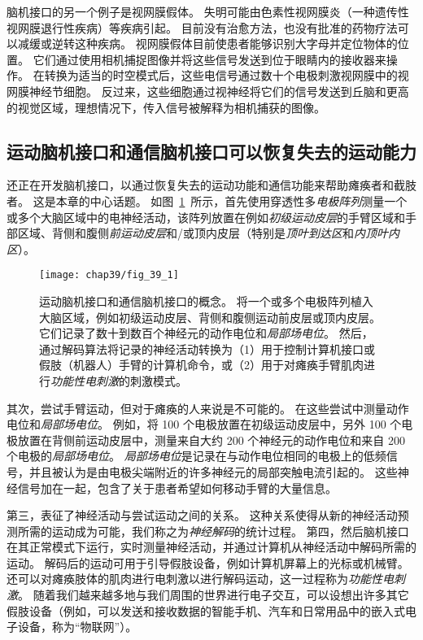 脑机接口的另一个例子是视网膜假体。
失明可能由色素性视网膜炎（一种遗传性视网膜退行性疾病）等疾病引起。
目前没有治愈方法，也没有批准的药物疗法可以减缓或逆转这种疾病。
视网膜假体目前使患者能够识别大字母并定位物体的位置。
它们通过使用相机捕捉图像并将这些信号发送到位于眼睛内的接收器来操作。
在转换为适当的时空模式后，这些电信号通过数十个电极刺激视网膜中的视网膜神经节细胞。
反过来，这些细胞通过视神经将它们的信号发送到丘脑和更高的视觉区域，理想情况下，传入信号被解释为相机捕获的图像。



\subsection{运动脑机接口和通信脑机接口可以恢复失去的运动能力}

还正在开发脑机接口，以通过恢复失去的运动功能和通信功能来帮助瘫痪者和截肢者。
这是本章的中心话题。
如图~\ref{fig:39_1}~所示，首先使用穿透性多\textit{电极阵列}测量一个或多个大脑区域中的电神经活动，该阵列放置在例如\textit{初级运动皮层}的手臂区域和手部区域、背侧和腹侧\textit{前运动皮层}和/或顶内皮层（特别是\textit{顶叶到达区}和\textit{内顶叶内区}）。


\begin{figure}[htbp]
	\centering
	\texttt{[image: chap39/fig\_39\_1]}
	\caption{运动脑机接口和通信脑机接口的概念。
		将一个或多个电极阵列植入大脑区域，例如初级运动皮层、背侧和腹侧运动前皮层或顶内皮层。
		它们记录了数十到数百个神经元的动作电位和\textit{局部场电位}。
		然后，通过解码算法将记录的神经活动转换为（1）用于控制计算机接口或假肢（机器人）手臂的计算机命令，或（2）用于对瘫痪手臂肌肉进行\textit{功能性电刺激}的刺激模式。}
	\label{fig:39_1}
\end{figure}


其次，尝试手臂运动，但对于瘫痪的人来说是不可能的。
在这些尝试中测量动作电位和\textit{局部场电位}。
例如，将 100 个电极放置在初级运动皮层中，另外 100 个电极放置在背侧前运动皮层中，测量来自大约 200 个神经元的动作电位和来自 200 个电极的\textit{局部场电位}。
\textit{局部场电位}是记录在与动作电位相同的电极上的低频信号，并且被认为是由电极尖端附近的许多神经元的局部突触电流引起的。
这些神经信号加在一起，包含了关于患者希望如何移动手臂的大量信息。


第三，表征了神经活动与尝试运动之间的关系。
这种关系使得从新的神经活动预测所需的运动成为可能，我们称之为\textit{神经解码}的统计过程。
第四，然后脑机接口在其正常模式下运行，实时测量神经活动，并通过计算机从神经活动中解码所需的运动。
解码后的运动可用于引导假肢设备，例如计算机屏幕上的光标或机械臂。
还可以对瘫痪肢体的肌肉进行电刺激以进行解码运动，这一过程称为\textit{功能性电刺激}。
随着我们越来越多地与我们周围的世界进行电子交互，可以设想出许多其它假肢设备（例如，可以发送和接收数据的智能手机、汽车和日常用品中的嵌入式电子设备，称为“物联网”）。


